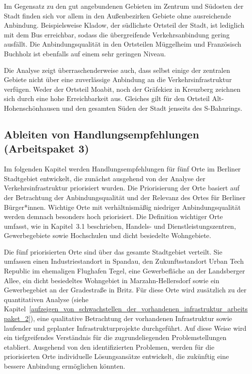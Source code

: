 Im Gegensatz zu den gut angebundenen Gebieten im Zentrum und Südosten der Stadt finden sich vor allem in den Außenbezirken Gebiete ohne ausreichende Anbindung. Beispielsweise Kladow, der südlichste Ortsteil der Stadt, ist lediglich mit dem Bus erreichbar, sodass die übergreifende Verkehrsanbindung gering ausfällt. Die Anbindungsqualität in den Ortsteilen Müggelheim und Französisch Buchholz ist ebenfalls auf einem sehr geringen Niveau.

Die Analyse zeigt überraschenderweise auch, dass selbst einige der zentralen Gebiete nicht über eine zuverlässige Anbindung an die Verkehrsinfrastruktur verfügen. Weder der Ortsteil Moabit, noch der Gräfekiez in Kreuzberg zeichnen sich durch eine hohe Erreichbarkeit aus. Gleiches gilt für den Ortsteil Alt-Hohenschönhausen und den gesamten Süden der Stadt jenseits des S-Bahnrings.

\subsection{Ableiten von Handlungsempfehlungen (Arbeitspaket 3)}
\label{ableiten_von_handlungsempfehlungen_arbeitspaket_3}

Im folgenden Kapitel werden Handlungsempfehlungen für fünf Orte im Berliner Stadtgebiet entwickelt, die zunächst ausgehend von der Analyse der Verkehrsinfrastruktur priorisiert wurden. Die Priorisierung der Orte basiert auf der Betrachtung der Anbindungsqualität und der Relevanz des Ortes für Berliner Bürger*innen. Wichtige Orte mit verhältnismäßig niedriger Anbindungsqualität werden demnach besonders hoch priorisiert. Die Definition wichtiger Orte umfasst, wie in Kapitel~3.1 beschrieben, Handels- und Dienstleistungszentren, Gewerbegebiete sowie Hochschulen und dicht besiedelte Wohngebiete.

Die fünf priorisierten Orte sind über das gesamte Stadtgebiet verteilt. Sie umfassen einen Industriestandort in Spandau, den Zukunftsstandort Urban Tech Republic im ehemaligen Flughafen Tegel, eine Gewerbefläche an der Landsberger Allee, ein dicht besiedeltes Wohngebiet in Marzahn-Hellersdorf sowie ein Gewerbegebiet an der Gradestraße in Britz. Für diese Orte wird zusätzlich zu der quantitativen Analyse (siehe Kapitel~\ref{aufzeigen_von_schwachstellen_der_vorhandenen_infrastruktur_arbeitspaket_2}), eine qualitative Betrachtung der vorhandenen Infrastruktur sowie laufender und geplanter Infrastrukturprojekte durchgeführt. Auf diese Weise wird ein tiefgreifendes Verständnis für die zugrundeliegenden Problemstellungen etabliert. Ausgehend von den identifizierten Problemen, werden für die priorisierten Orte individuelle Lösungsansätze entwickelt, die zukünftig eine bessere Anbindung ermöglichen könnten.

